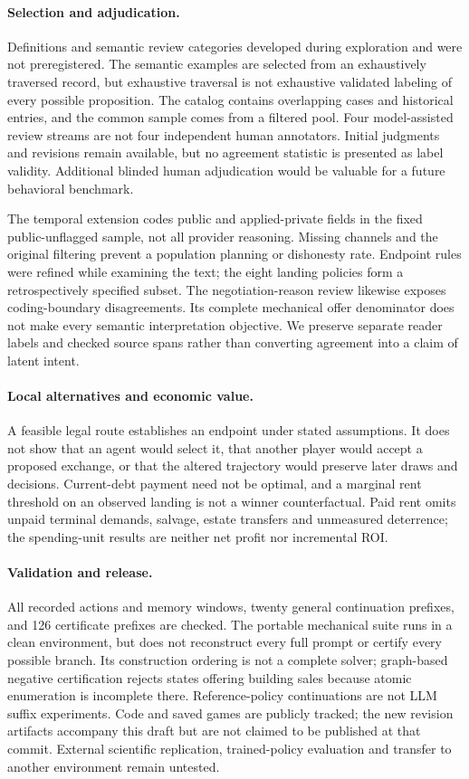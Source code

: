 \paragraph{Selection and adjudication.}
Definitions and semantic review categories developed during exploration and were not preregistered. The semantic examples are selected from an exhaustively traversed record, but exhaustive traversal is not exhaustive validated labeling of every possible proposition. The catalog contains overlapping cases and historical entries, and the common sample comes from a filtered pool. Four model-assisted review streams are not four independent human annotators. Initial judgments and revisions remain available, but no agreement statistic is presented as label validity. Additional blinded human adjudication would be valuable for a future behavioral benchmark.

The temporal extension codes public and applied-private fields in the fixed public-unflagged sample, not all provider reasoning. Missing channels and the original filtering prevent a population planning or dishonesty rate. Endpoint rules were refined while examining the text; the eight landing policies form a retrospectively specified subset. The negotiation-reason review likewise exposes coding-boundary disagreements. Its complete mechanical offer denominator does not make every semantic interpretation objective. We preserve separate reader labels and checked source spans rather than converting agreement into a claim of latent intent.

\paragraph{Local alternatives and economic value.}
A feasible legal route establishes an endpoint under stated assumptions. It does not show that an agent would select it, that another player would accept a proposed exchange, or that the altered trajectory would preserve later draws and decisions. Current-debt payment need not be optimal, and a marginal rent threshold on an observed landing is not a winner counterfactual. Paid rent omits unpaid terminal demands, salvage, estate transfers and unmeasured deterrence; the spending-unit results are neither net profit nor incremental ROI.

\paragraph{Validation and release.}
All recorded actions and memory windows, twenty general continuation prefixes, and 126 certificate prefixes are checked. The portable mechanical suite runs in a clean environment, but does not reconstruct every full prompt or certify every possible branch. Its construction ordering is not a complete solver; graph-based negative certification rejects states offering building sales because atomic enumeration is incomplete there. Reference-policy continuations are not LLM suffix experiments. Code and saved games are publicly tracked; the new revision artifacts accompany this draft but are not claimed to be published at that commit. External scientific replication, trained-policy evaluation and transfer to another environment remain untested.


